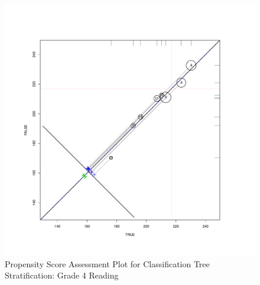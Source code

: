\documentclass[letterpaper,12p,twoside]{article} %
\begin{document}
\clearpage
\begin{figure}
\begin{center}
\includegraphics[height=.4\textheight,width=.4\textheight]{../Figures2009/g4read-circpsa-tree.pdf}
\caption{Propensity Score Assessment Plot for Classification Tree Stratification: Grade 4 Reading}
\end{center}
\end{figure}


\end{document}

